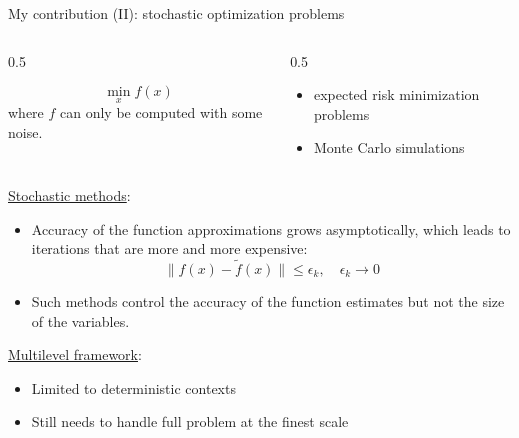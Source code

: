 \documentclass{beamer}
\begin{document}
\begin{frame}{My contribution (II): stochastic optimization problems}

\begin{columns}
\begin{column}{0.5\textwidth}
	\begin{footnotesize}
\begin{tcolorbox}[
    colback=gray!10,
    colframe=gray!70!black,
        fonttitle=\bfseries,
]

	$$
	\min_x f(x)
	$$
	where $f$ can only be computed \alert{with some noise}.
	\end{tcolorbox}
	\end{footnotesize}
	\end{column}
\begin{column}{0.5\textwidth}

	
	
	\begin{itemize}
	\item expected risk minimization problems
	\item Monte Carlo simulations
      \end{itemize}

 \end{column}
\end{columns}
 
	\begin{footnotesize}
\begin{tcolorbox}[
        title={\faExclamationTriangle\ Limitations  of existing methods},
    colback=red!10,
    colframe=red!70!black,
        fonttitle=\bfseries,
]
\underline{Stochastic methods}: 
 \begin{itemize}
 \item 
 Accuracy of the function approximations \alert{grows} asymptotically, which leads to iterations that are more and more expensive:
 $$
 \|f(x)-\tilde f(x)\|\leq \epsilon_k, \quad \epsilon_k\rightarrow 0
 $$
  \item Such methods control the accuracy of the function estimates but not the \alert{size of the variables}.   
 \end{itemize}

 

\underline{Multilevel framework}:
\begin{itemize}
 \item Limited to \alert{deterministic} contexts
 \item Still needs to handle \alert{full problem} at the finest scale
 \end{itemize}


\end{tcolorbox}
\end{footnotesize}
 
  

 \end{frame}
\end{document}
